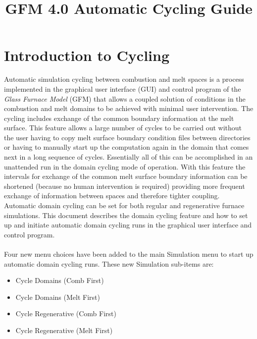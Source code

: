 \documentclass[12pt]{article}
\title{  \bf GFM 4.0 Automatic Cycling Guide}
\date{}
\newcommand{\menu}[1]{\textsf{#1}}
\numberwithin{equation}{section}
\begin{document}
\maketitle
\section{Introduction to Cycling}
\label{sec:intro}
Automatic simulation cycling between combustion and melt spaces is a process implemented in the graphical user interface (GUI) and control program of the \emph{Glass Furnace Model} (GFM) that allows a coupled solution of conditions in the combustion and melt domains to be achieved with minimal user intervention. The cycling includes exchange of the common boundary information at the melt surface. This feature allows a large number of cycles to be carried out without the user having to copy melt surface boundary condition files between directories or having to manually start up the computation again in the domain that comes next in a long sequence of cycles. Essentially all of this can be accomplished in an unattended run in the domain cycling mode of operation. With this feature the intervals for exchange of the common melt surface boundary information can be shortened (because no human intervention is required) providing more frequent exchange of information between spaces and therefore tighter coupling. Automatic domain cycling can be set for both regular and regenerative furnace simulations.
This document describes the domain cycling feature and how to set up and initiate automatic domain cycling runs in the graphical user interface and control program.\\
\\
Four new menu choices have been added to the main \menu{Simulation} menu to start up automatic domain cycling runs.   
These new \menu{Simulation} sub-items are:
\begin{itemize}
\item[ ] \menu{Cycle Domains (Comb First)}
\item[ ] \menu{Cycle Domains (Melt First)}
\item[ ] \menu{Cycle Regenerative (Comb First)}
\item[ ] \menu{Cycle Regenerative (Melt First)}
\end{itemize}
\end{document}
